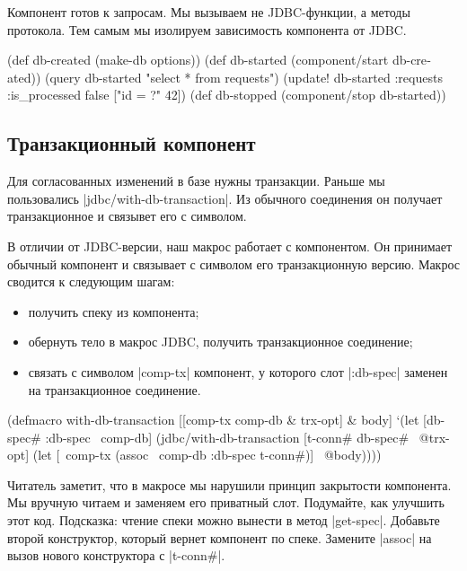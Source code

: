 Компонент готов к запросам. Мы вызываем не JDBC-функции, а методы протокола. Тем
самым мы изолируем зависимость компонента от JDBC.

\begin{english}
  \begin{clojure}
(def db-created (make-db options))
(def db-started (component/start db-created))
(query db-started "select * from requests")
(update! db-started :requests {:is_processed false} ["id = ?" 42])
(def db-stopped (component/stop db-started))
  \end{clojure}
\end{english}

\subsection{Транзакционный компонент}

Для согласованных изменений в базе нужны транзакции. Раньше мы пользовались
\spverb|jdbc/with-db-transaction|. Из обычного соединения он получает
транзакционное и связывет его с символом.

В отличии от JDBC-версии, наш макрос работает с компонентом. Он принимает
обычный компонент и связывает с символом его транзакционную версию. Макрос
сводится к следующим шагам:

\begin{itemize}

\item
  получить спеку из компонента;

\item
  обернуть тело в макрос JDBC, получить транзакционное соединение;

\item
  связать с символом \spverb|comp-tx| компонент, у которого слот \spverb|:db-spec| заменен на
  транзакционное соединение.

\end{itemize}

\begin{english}
  \begin{clojure}
(defmacro with-db-transaction
  [[comp-tx comp-db & trx-opt] & body]
  `(let [{db-spec# :db-spec} ~comp-db]
     (jdbc/with-db-transaction
       [t-conn# db-spec# ~@trx-opt]
       (let [~comp-tx (assoc ~comp-db :db-spec t-conn#)]
         ~@body))))
  \end{clojure}
\end{english}

Читатель заметит, что в макросе мы нарушили принцип закрытости компонента. Мы
вручную читаем и заменяем его приватный слот. Подумайте, как улучшить этот
код. Подсказка: чтение спеки можно вынести в метод \spverb|get-spec|. Добавьте
второй конструктор, который вернет компонент по спеке. Замените \spverb|assoc|
на вызов нового конструктора с \spverb|t-conn#|.

